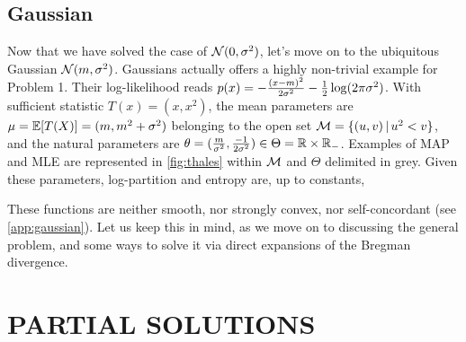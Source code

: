 \documentclass[twoside]{article}
\let\oldsection\section
\renewcommand{\section}[1]{\oldsection{\texorpdfstring{\uppercase{#1}}{#1}}}
\newcommand{\cond}{\,\vert\,}
\newcommand{\logpart}{A}
\newcommand{\conj}{\logpart^*}
\newcommand{\nat}{\theta}
\newcommand{\m}{\mu}
\begin{document}
\subsection{Gaussian}
\label{ssec:gaussian}
Now that we have solved the case of ${\mathcal N}(0,\sigma^2)$, let's move on to the ubiquitous Gaussian ${\mathcal N}(m,\sigma^2)$.
Gaussians actually offers a highly non-trivial example for Problem 1.
Their log-likelihood reads $p(x) = -\frac{(x-m)^2}{2 \sigma^2} - \frac{1}{2} \log(2\pi\sigma^2)$.
With sufficient statistic $T(x)=(x, x^2)$, 
the mean parameters are $\m = \E[T(X)] = (m , m^2 + \sigma^2)$ belonging to the open set $\cM= \{(u,v) \cond u^2 < v\}$,
and the natural parameters are $\nat= (\frac{m}{\sigma^2} , \frac{-1}{2\sigma^2}) \in \Theta = \real \times \real_-$. 
Examples of MAP and MLE  are represented in \cref{fig:thales} within ${\mathcal M}$ and $\Theta$ delimited in grey.
Given these parameters, log-partition and entropy are, up to constants, 
\alignn{
	\logpart(\nat) &= \frac{\nat_1^2}{-4\nat_2} - \half \log(-2\nat_2) \\
	\conj(\m) &= - \half \log (\mu_2 - \mu_1^2)
}

These functions are neither smooth, nor strongly convex, nor self-concordant (see \cref{app:gaussian}).
Let us keep this in mind, as we move on to discussing the general problem, and some ways to solve it via direct expansions of the Bregman divergence.

\section{Partial Solutions}
\label{sec:insights}
\end{document}
